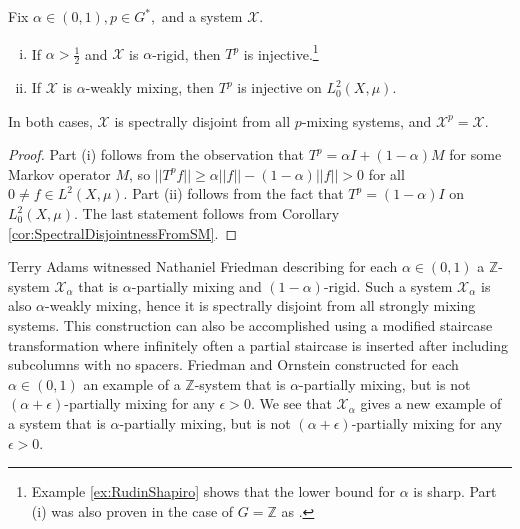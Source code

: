 \documentclass[graybox]{svmult}
\theoremstyle{definition}
\begin{document}
\begin{proposition}
    Fix $\alpha \in (0,1), p \in G^*,$ and a system $\mathcal{X}$.
    \begin{enumerate}[(i)]
        \item If $\alpha > \frac{1}{2}$ and $\mathcal{X}$ is $\alpha$-rigid, then $T^p$ is injective.\footnote{Example \ref{ex:RudinShapiro} shows that the lower bound for $\alpha$ is sharp. Part (i) was also proven in the case of $G = \mathbb{Z}$ as \cite[Theorem 5]{SpectrumOfAlphaRigidMaps}.}

        \item If $\mathcal{X}$ is $\alpha$-weakly mixing, then $T^p$ is injective on $L^2_0(X,\mu)$.
    \end{enumerate}
    In both cases, $\mathcal{X}$ is spectrally disjoint from all $p$-mixing systems, and $\mathcal{X}^p = \mathcal{X}$.
\end{proposition}

\begin{proof}
    Part (i) follows from the observation that $T^p = \alpha I+(1-\alpha)M$ for some Markov operator $M$, so $||T^pf|| \ge \alpha||f||-(1-\alpha)||f|| > 0$ for all $0 \neq f \in L^2(X,\mu)$.
    Part (ii) follows from the fact that $T^p = (1-\alpha)I$ on $L^2_0(X,\mu)$.
    The last statement follows from Corollary \ref{cor:SpectralDisjointnessFromSM}.
\end{proof}

\begin{remark}
    Terry Adams witnessed Nathaniel Friedman describing for each $\alpha \in (0,1)$ a $\mathbb{Z}$-system $\mathcal{X}_\alpha$ that is $\alpha$-partially mixing and $(1-\alpha)$-rigid.
    Such a system $\mathcal{X}_\alpha$ is also $\alpha$-weakly mixing, hence it is spectrally disjoint from all strongly mixing systems.
    This construction can also be accomplished using a modified staircase transformation where infinitely often a partial staircase is inserted after including subcolumns with no spacers.
    Friedman and Ornstein \cite{AlphaButNotAlphaPlusEpsilonPM} constructed for each $\alpha \in (0,1)$ an example of a $\mathbb{Z}$-system that is $\alpha$-partially mixing, but is not $(\alpha+\epsilon)$-partially mixing for any $\epsilon > 0$.
    We see that $\mathcal{X}_\alpha$ gives a new example of a system that is $\alpha$-partially mixing, but is not $(\alpha+\epsilon)$-partially mixing for any $\epsilon > 0$.
\end{remark}
\end{document}
